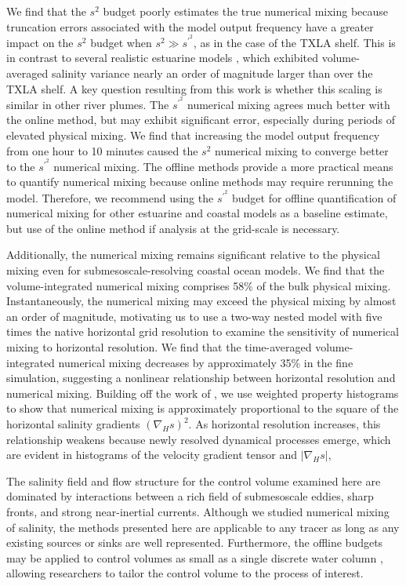 \documentclass[draft]{agujournal2019}
\begin{document}
We find that the $s^2$ budget poorly estimates the true numerical mixing because truncation errors associated with the model output frequency have a greater impact on the $s^2$ budget when $s^2\gg s^{\prime^2}$, as in the case of the TXLA shelf. This is in contrast to several realistic estuarine models \cite{Li_2018, Li_2021, Warner_2020}, which exhibited volume-averaged salinity variance nearly an order of magnitude larger than over the TXLA shelf. A key question resulting from this work is whether this scaling is similar in other river plumes. The $s^{\prime^2}$ numerical mixing agrees much better with the online method, but may exhibit significant error, especially during periods of elevated physical mixing. We find that increasing the model output frequency from one hour to 10 minutes caused the $s^2$ numerical mixing to converge better to the $s^{\prime^2}$ numerical mixing. The offline methods provide a more practical means to quantify numerical mixing because online methods may require rerunning the model. Therefore, we recommend using the $s^{\prime^2}$ budget for offline quantification of numerical mixing for other estuarine and coastal models as a baseline estimate, but use of the online method if analysis at the grid-scale is necessary.

Additionally, the numerical mixing remains significant relative to the physical mixing even for submesoscale-resolving coastal ocean models. We find that the volume-integrated numerical mixing comprises 58$\%$ of the bulk physical mixing. Instantaneously, the numerical mixing may exceed the physical mixing by almost an order of magnitude, motivating us to use a two-way nested model with five times the native horizontal grid resolution to examine the sensitivity of numerical mixing to horizontal resolution. We find that the time-averaged volume-integrated numerical mixing decreases by approximately 35$\%$ in the fine simulation, suggesting a nonlinear relationship between horizontal resolution and numerical mixing. Building off the work of , we use weighted property histograms to show that numerical mixing is approximately proportional to the square of the horizontal salinity gradients $(\nabla_H s)^2$. As horizontal resolution increases, this relationship weakens because newly resolved dynamical processes emerge, which are evident in histograms of the velocity gradient tensor and $|\nabla_H s|$, 

The salinity field and flow structure for the control volume examined here are dominated by interactions between a rich field of submesoscale eddies, sharp fronts, and strong near-inertial currents. Although we studied numerical mixing of salinity, the methods presented here are applicable to any tracer as long as any existing sources or sinks are well represented. Furthermore, the offline budgets may be applied to control volumes as small as a single discrete water column \cite{Wang_2021}, allowing researchers to tailor the control volume to the process of interest. 
\end{document}
